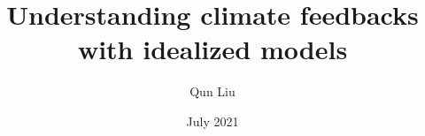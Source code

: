 \documentclass[a4paper,onehalfspacing,twoside,12pt,numbers=noenddot]{exeterthesis}
\title{Understanding climate feedbacks with idealized models}
\author{Qun Liu}
\date{July 2021}
\begin{document}



 \newpage
 \renewcommand{\nomname}{Nomenclature and Abbreviations}
 \setlength{\nomlabelwidth}{2.5cm}
 \setlength{\nomitemsep}{-\parsep}
 
 \printnomenclature
 \label{glossary}

\pagestyle{fancy}


% 
% 
% 




\addappheadtotoc
\appendixpage

\begin{appendices}
\renewcommand\chaptermark[1]{\markboth{\appendixname~\thechapter. #1}{}}


%

\end{appendices}

\newpage
{}

\small{

%

}


\newpage
\printindex
\end{document}
